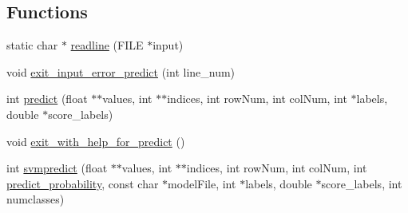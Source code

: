 \subsection*{Functions}
\begin{DoxyCompactItemize}
\item 
static char $\ast$ \hyperlink{svm-predict_8cpp_aa324656b7bb4eb3ee42699d33c21ef7a}{readline} (F\-I\-L\-E $\ast$input)
\item 
void \hyperlink{svm-predict_8cpp_a9f4f4674bfe1596b0b4ff14005b047f5}{exit\-\_\-input\-\_\-error\-\_\-predict} (int line\-\_\-num)
\item 
int \hyperlink{svm-predict_8cpp_ae6ecfcdf838de45a1c4e65c6341d0bfa}{predict} (float $\ast$$\ast$values, int $\ast$$\ast$indices, int row\-Num, int col\-Num, int $\ast$labels, double $\ast$score\-\_\-labels)
\item 
void \hyperlink{svm-predict_8cpp_a7afe98ad0e31dd12549d624e922f3eae}{exit\-\_\-with\-\_\-help\-\_\-for\-\_\-predict} ()
\item 
int \hyperlink{svm-predict_8cpp_aca788894c462e86397220c8180009a98}{svmpredict} (float $\ast$$\ast$values, int $\ast$$\ast$indices, int row\-Num, int col\-Num, int \hyperlink{_2svm-predict_8cpp_a1501132f5226b295e5300d74da55a2b9}{predict\-\_\-probability}, const char $\ast$model\-File, int $\ast$labels, double $\ast$score\-\_\-labels, int numclasses)
\end{DoxyCompactItemize}
